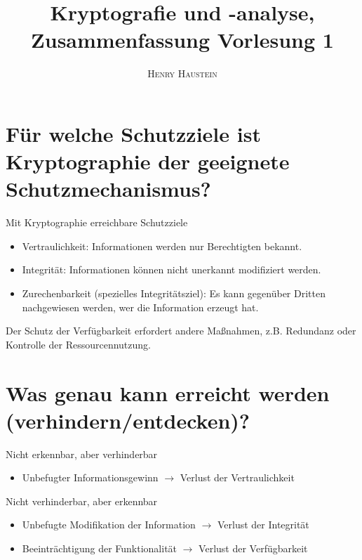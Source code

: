 \documentclass{article}
\title{\textbf{Kryptografie und -analyse, Zusammenfassung Vorlesung 1}}
\author{\textsc{Henry Haustein}}
\date{}
\begin{document}
	\maketitle
	
	\section*{Für welche Schutzziele ist Kryptographie der geeignete Schutzmechanismus?}
	Mit Kryptographie erreichbare Schutzziele
	\begin{itemize}
		\item Vertraulichkeit: Informationen werden nur Berechtigten bekannt.
		\item Integrität: Informationen können nicht unerkannt modifiziert werden.
		\item Zurechenbarkeit (spezielles Integritätsziel): Es kann gegenüber Dritten nachgewiesen werden, wer die Information erzeugt hat.
	\end{itemize}
	Der Schutz der Verfügbarkeit erfordert andere Maßnahmen, z.B. Redundanz oder Kontrolle der Ressourcen\-nutzung.

	\section*{Was genau kann erreicht werden (verhindern/entdecken)?}
	Nicht erkennbar, aber verhinderbar
	\begin{itemize}
		\item Unbefugter Informationsgewinn $\to$ Verlust der Vertraulichkeit
	\end{itemize}
	Nicht verhinderbar, aber erkennbar
	\begin{itemize}
		\item Unbefugte Modifikation der Information $\to$ Verlust der Integrität
		\item Beeinträchtigung der Funktionalität $\to$ Verlust der Verfügbarkeit
	\end{itemize}
	
\end{document}
